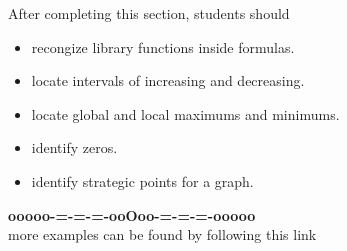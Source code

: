 \documentclass{ximera}
\begin{document}
\begin{sectionOutcomes}
After completing this section, students should 

\begin{itemize}
\item recongize library functions inside formulas.
\item locate intervals of increasing and decreasing.
\item locate global and local maximums and minimums.
\item identify zeros.
\item identify strategic points for a graph.
\end{itemize}
\end{sectionOutcomes}





\begin{center}
\textbf{\textcolor{green!50!black}{ooooo-=-=-=-ooOoo-=-=-=-ooooo}} \\

more examples can be found by following this link\\ 

\end{center}
\end{document}
